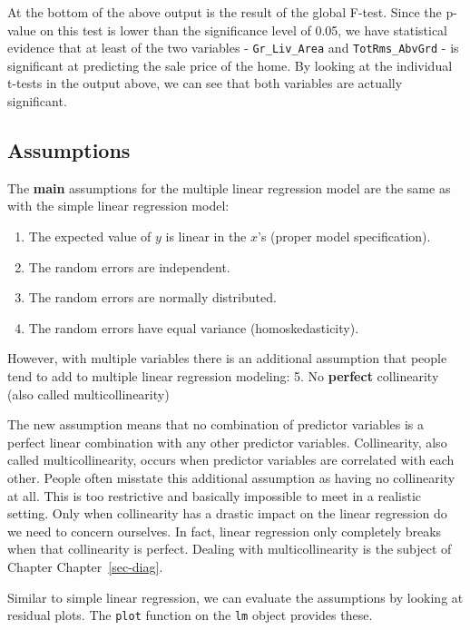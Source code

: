 \documentclass[
  letterpaper,
  DIV=11,
  numbers=noendperiod]{scrreprt}
\providecommand{\tightlist}{%
  \setlength{\itemsep}{0pt}\setlength{\parskip}{0pt}}\usepackage{longtable,booktabs,array}
\begin{document}
At the bottom of the above output is the result of the global F-test.
Since the p-value on this test is lower than the significance level of
0.05, we have statistical evidence that at least of the two variables -
\texttt{Gr\_Liv\_Area} and \texttt{TotRms\_AbvGrd} - is significant at
predicting the sale price of the home. By looking at the individual
t-tests in the output above, we can see that both variables are actually
significant.

\hypertarget{assumptions-2}{%
\subsection{Assumptions}\label{assumptions-2}}

The \textbf{main} assumptions for the multiple linear regression model
are the same as with the simple linear regression model:

\begin{enumerate}
\def\labelenumi{\arabic{enumi}.}
\tightlist
\item
  The expected value of \(y\) is linear in the \(x\)'s (proper model
  specification).
\item
  The random errors are independent.
\item
  The random errors are normally distributed.
\item
  The random errors have equal variance (homoskedasticity).
\end{enumerate}

However, with multiple variables there is an additional assumption that
people tend to add to multiple linear regression modeling: 5. No
\textbf{perfect} collinearity (also called multicollinearity)

The new assumption means that no combination of predictor variables is a
perfect linear combination with any other predictor variables.
Collinearity, also called multicollinearity, occurs when predictor
variables are correlated with each other. People often misstate this
additional assumption as having no collinearity at all. This is too
restrictive and basically impossible to meet in a realistic setting.
Only when collinearity has a drastic impact on the linear regression do
we need to concern ourselves. In fact, linear regression only completely
breaks when that collinearity is perfect. Dealing with multicollinearity
is the subject of Chapter Chapter~\ref{sec-diag}.

Similar to simple linear regression, we can evaluate the assumptions by
looking at residual plots. The \texttt{plot} function on the \texttt{lm}
object provides these.
\end{document}
